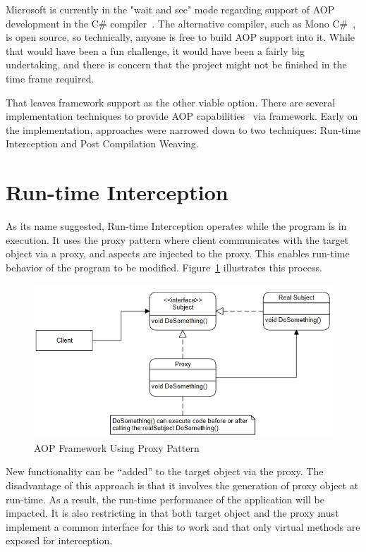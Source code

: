 Microsoft is currently in the "wait and see" mode regarding support of AOP development in the C\# compiler~\cite{hejlsberg}. The alternative compiler, such as Mono C\#~\cite{monocsharp}, is open source, so technically, anyone is free to build AOP support into it. While that would have been a fun challenge, it would have been a fairly big undertaking, and there is concern that the project might not be finished in the time frame required.

That leaves framework support as the other viable option. There are several implementation techniques to provide AOP capabilities~\cite{aopcs, postsharp, aspectcs} via framework. Early on the implementation, approaches were narrowed down to two techniques: Run-time Interception and Post Compilation Weaving.

\section{Run-time Interception}

As its name suggested, Run-time Interception operates while the program is in execution. It uses the proxy pattern where client communicates with the target object via a proxy, and aspects are injected to the proxy. This enables run-time behavior of the program to be modified. Figure~\ref{proxy_model} illustrates this process.

\begin{figure}[H]
  \includegraphics[scale=1.0]{Proxy3.PNG}
  \centering
  \caption{AOP Framework Using Proxy Pattern\label{proxy_model}}
\end{figure}

New functionality can be “added” to the target object via the proxy. The disadvantage of this approach is that it involves the generation of proxy object at run-time. As a result, the run-time performance of the application will be impacted. It is also restricting in that both target object and the proxy must implement a common interface for this to work and that only virtual methods are exposed for interception.

